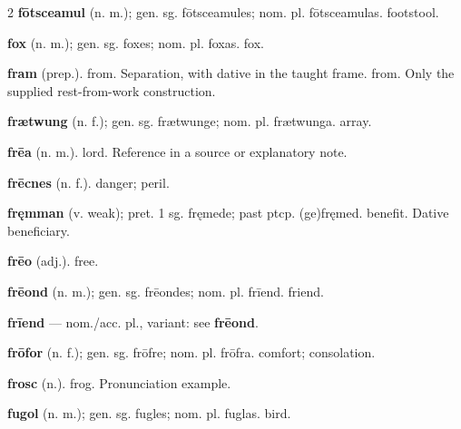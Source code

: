 \begin{multicols*}{2}
\textbf{fōtsceamul} (n. m.); gen. sg. fōtsceamules; nom. pl. fōtsceamulas. footstool.\par
\textbf{fox} (n. m.); gen. sg. foxes; nom. pl. foxas. fox.\par
\textbf{fram} (prep.). from. Separation, with dative in the taught frame. from. Only the supplied rest-from-work construction.\par
\textbf{frætwung} (n. f.); gen. sg. frætwunge; nom. pl. frætwunga. array.\par
\textbf{frēa} (n. m.). lord. Reference in a source or explanatory note.\par
\textbf{frēcnes} (n. f.). danger; peril.\par
\textbf{fręmman} (v. weak); pret. 1 sg. fręmede; past ptcp. (ge)fręmed. benefit. Dative beneficiary.\par
\textbf{frēo} (adj.). free.\par
\textbf{frēond} (n. m.); gen. sg. frēondes; nom. pl. frīend. friend.\par
\textbf{frīend} — nom./acc. pl., variant: see \textbf{frēond}.\par
\textbf{frōfor} (n. f.); gen. sg. frōfre; nom. pl. frōfra. comfort; consolation.\par
\textbf{frosc} (n.). frog. Pronunciation example.\par
\textbf{fugol} (n. m.); gen. sg. fugles; nom. pl. fuglas. bird.\par

\end{multicols*}
